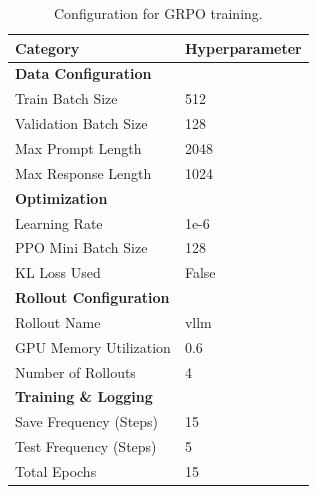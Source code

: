 \begin{table}[ht]
\centering
\small
\begin{tabular}{ll}
\toprule
\textbf{Category} & \textbf{Hyperparameter} \\
\midrule
\multicolumn{2}{l}{\textbf{Data Configuration}} \\
\midrule
Train Batch Size & 512 \\
Validation Batch Size & 128 \\
Max Prompt Length & 2048 \\
Max Response Length & 1024 \\
\midrule
\multicolumn{2}{l}{\textbf{Optimization}} \\
\midrule
Learning Rate & 1e-6 \\
PPO Mini Batch Size & 128 \\
KL Loss Used & False \\
\midrule
\multicolumn{2}{l}{\textbf{Rollout Configuration}} \\
\midrule
Rollout Name & vllm \\
GPU Memory Utilization & 0.6 \\
Number of Rollouts & 4 \\
\midrule
\multicolumn{2}{l}{\textbf{Training \& Logging}} \\
\midrule
Save Frequency (Steps) & 15 \\
Test Frequency (Steps) & 5 \\
Total Epochs & 15 \\
\bottomrule
\end{tabular}
\caption{Configuration for GRPO training.}
\label{tab:training_hparams}
\end{table}
